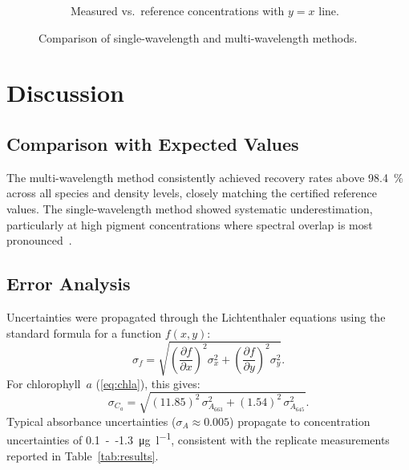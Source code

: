 \documentclass[
    language=english,
    doctype=article,
    institution=none,
    titlestyle=book,
]{../../omnilatex}
\begin{document}
\begin{figure}[htbp]
\begin{subfigure}[t]{0.48\textwidth}
        \caption{Measured vs.\ reference concentrations with $y = x$ line.}
        \label{fig:scatter}
    \end{subfigure}
    \caption{Comparison of single-wavelength and multi-wavelength methods.}
    \label{fig:methods}
\end{figure}

\section{Discussion}

\subsection{Comparison with Expected Values}
The multi-wavelength method consistently achieved recovery rates above
\SI{98.4}{\percent} across all species and density levels, closely matching the
certified reference values.  The single-wavelength method showed systematic
underestimation, particularly at high pigment concentrations where spectral
overlap is most pronounced~\cite{goossensLaTeXCompanion1993}.

\subsection{Error Analysis}
Uncertainties were propagated through the Lichtenthaler equations using the
standard formula for a function $f(x,y)$:
\begin{equation}
    \sigma_{f} = \sqrt{
        \left(\frac{\partial f}{\partial x}\right)^{2}\sigma_{x}^{2}
        + \left(\frac{\partial f}{\partial y}\right)^{2}\sigma_{y}^{2}
    }.
    \label{eq:errorprop}
\end{equation}
For chlorophyll~$a$ (\ref{eq:chla}), this gives:
\begin{equation}
    \sigma_{C_{a}} = \sqrt{
        (11.85)^{2}\,\sigma_{A_{663}}^{2}
        + (1.54)^{2}\,\sigma_{A_{645}}^{2}
    }.
    \label{eq:chlaerror}
\end{equation}
Typical absorbance uncertainties (\(\sigma_{A} \approx 0.005\)) propagate to
concentration uncertainties of \SI{0.1}{--}\SI{1.3}{\micro\gram\per\litre},
consistent with the replicate measurements reported in Table~\ref{tab:results}.
\end{document}
